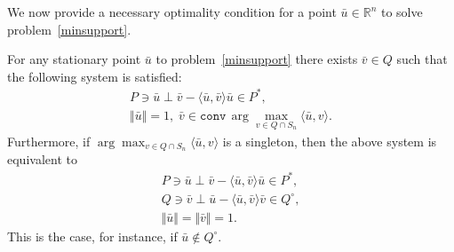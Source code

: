 \documentclass[hidelinks,onefignum,onetabnum]{siamart250211}
\theoremstyle{definition}
\theoremstyle{remark}
\newcommand{\R}{\mathbb R}
\newcommand{\bv}{\bar{v}}
\newcommand{\bu}{\bar{u}}
\newcommand{\inner}[2]{\langle#1,#2\rangle}
\newcommand{\norm}[1]{\textstyle{\Vert} #1 \textstyle{\Vert}}
\begin{document}
We now provide a necessary optimality condition for a point $\bar u\in \R^n$ to solve problem~\eqref{minsupport}.
%
\begin{proposition} \label{prop:stat}
    For any stationary point $\bar u$ to problem~\eqref{minsupport} there exists $\bv\in Q$ such that the following system is satisfied:
\begin{equation}\label{optim}
 \begin{array}{l}
P\ni\bu\perp \bv -\langle\bu,\bv\rangle \bu\in P^\ast,\\
\norm{\bar u}=1,\; \bar v \in \mathtt{conv\,}\arg\max_{v \in Q\cap S_n} \inner{\bar u}{v}.
\end{array}   
\end{equation}
Furthermore, if $\arg\max_{v \in Q\cap S_n} \inner{\bar u}{v}$ is a singleton, then the above system is equivalent to 
\begin{equation}\label{optim2}
 \begin{array}{l}
P\ni\bu\perp \bv -\langle\bu,\bv\rangle \bu\in P^\ast,\\
Q\ni\bv\perp \bu -\langle\bu,\bv\rangle \bv\in Q^\circ,\\
\norm{\bar u}=\norm{\bar v} =1.
\end{array}
\end{equation}
This is the case, for instance, if $\bar u\not \in Q^\circ$.
\end{proposition}
\end{document}
